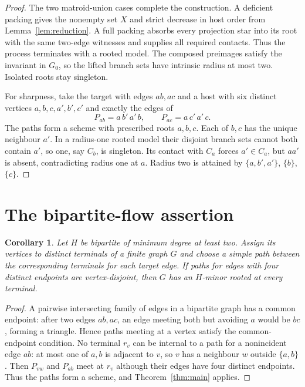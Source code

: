\documentclass[11pt]{amsart}
\newtheorem{corollary}[theorem]{Corollary}
\begin{document}
\begin{proof}
The two matroid-union cases complete the construction. A deficient
packing gives the nonempty set $X$ and strict decrease in host order
from Lemma~\ref{lem:reduction}. A full packing absorbs every projection
star into its root with the same two-edge witnesses and supplies all
required contacts. Thus the process terminates with a rooted model.
The composed preimages satisfy the invariant in $G_0$, so the lifted
branch sets have intrinsic radius at most two. Isolated roots stay singleton.

For sharpness, take the target with edges $ab,ac$ and a host with six
distinct vertices $a,b,c,a',b',c'$ and exactly the edges of
\[
 P_{ab}=a\,b'\,a'\,b,\qquad P_{ac}=a\,c'\,a'\,c.
\]
The paths form a scheme with prescribed roots $a,b,c$. Each of $b,c$
has the unique neighbour $a'$. In a radius-one rooted model their
disjoint branch sets cannot both contain $a'$, so one, say $C_b$, is
singleton. Its contact with $C_a$ forces $a'\in C_a$, but $aa'$ is
absent, contradicting radius one at $a$. Radius two is attained by
$\{a,b',a'\}$, $\{b\}$, $\{c\}$.
\end{proof}

\section{The bipartite-flow assertion}\label{sec:flow}

\begin{corollary}\label{cor:flow}
Let $H$ be bipartite of minimum degree at least two. Assign its vertices
to distinct terminals of a finite graph $G$ and choose a simple path
between the corresponding terminals for each target edge. If paths for
edges with four distinct endpoints are vertex-disjoint, then $G$ has an
$H$-minor rooted at every terminal.
\end{corollary}

\begin{proof}
A pairwise intersecting family of edges in a bipartite graph has a
common endpoint: after two edges $ab,ac$, an edge meeting both but
avoiding $a$ would be $bc$, forming a triangle. Hence paths meeting
at a vertex satisfy the common-endpoint condition. No terminal $r_v$
can be internal to a path for a nonincident edge $ab$: at most one of
$a,b$ is adjacent to $v$, so $v$ has a neighbour $w$ outside $\{a,b\}$.
Then $P_{vw}$ and $P_{ab}$ meet at $r_v$ although their edges have four
distinct endpoints. Thus the paths form a scheme, and
Theorem~\ref{thm:main} applies.
\end{proof}
\end{document}
